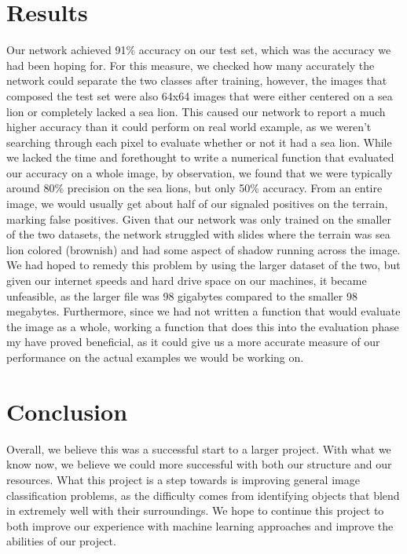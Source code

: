 \documentclass[letterpaper]{article}
\begin{document}
\section{Results}
Our network achieved 91\% accuracy on our test set, which was the accuracy we had been hoping for. For this measure, we checked how many accurately the network could separate the two classes after training, however, the images that composed the test set were also 64x64 images that were either centered on a sea lion or completely lacked a sea lion. This caused our network to report a much higher accuracy than it could perform on real world example, as we weren't searching through each pixel to evaluate whether or not it had a sea lion. While we lacked the time and forethought to write a numerical function that evaluated our accuracy on a whole image, by observation, we found that we were typically around 80\% precision on the sea lions, but only 50\% accuracy. From an entire image, we would usually get about half of our signaled positives on the terrain, marking false positives.
Given that our network was only trained on the smaller of the two datasets, the network struggled with slides where the terrain was sea lion colored (brownish) and had some aspect of shadow running across the image. We had hoped to remedy this problem by using the larger dataset of the two, but given our internet speeds and hard drive space on our machines, it became unfeasible, as the larger file was 98 gigabytes compared to the smaller 98 megabytes. Furthermore, since we had not written a function that would evaluate the image as a whole, working a function that does this into the evaluation phase my have proved beneficial, as it could give us a more accurate measure of our performance on the actual examples we would be working on.


\section{Conclusion}
Overall, we believe this was a successful start to a larger project. With what we know now, we believe we could more successful with both our structure and our resources. What this project is a step towards is improving general image classification problems, as the difficulty comes from identifying objects that blend in extremely well with their surroundings. We hope to continue this project to both improve our experience with machine learning approaches and improve the abilities of our project.
\end{document}
